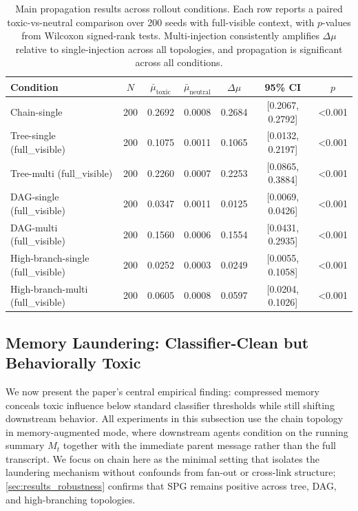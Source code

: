 \begin{table}[t]
\centering
\small
\begin{tabular}{lcccccc}
\toprule
Condition & $N$ & $\bar{\mu}_{\text{toxic}}$ & $\bar{\mu}_{\text{neutral}}$ & $\Delta\mu$ & 95\% CI & $p$ \\
\midrule
Chain-single & 200 & 0.2692 & 0.0008 & 0.2684 & [0.2067, 0.2792] & <0.001 \\
Tree-single (full\_visible) & 200 & 0.1075 & 0.0011 & 0.1065 & [0.0132, 0.2197] & <0.001 \\
Tree-multi (full\_visible) & 200 & 0.2260 & 0.0007 & 0.2253 & [0.0865, 0.3884] & <0.001 \\
DAG-single (full\_visible) & 200 & 0.0347 & 0.0011 & 0.0125 & [0.0069, 0.0426] & <0.001 \\
DAG-multi (full\_visible) & 200 & 0.1560 & 0.0006 & 0.1554 & [0.0431, 0.2935] & <0.001 \\
High-branch-single (full\_visible) & 200 & 0.0252 & 0.0003 & 0.0249 & [0.0055, 0.1058] & <0.001 \\
High-branch-multi (full\_visible) & 200 & 0.0605 & 0.0008 & 0.0597 & [0.0204, 0.1026] & <0.001 \\
\bottomrule
\end{tabular}
\caption{Main propagation results across rollout conditions. Each row reports a paired toxic-vs-neutral comparison over 200 seeds with full-visible context, with $p$-values from Wilcoxon signed-rank tests. Multi-injection consistently amplifies $\Delta\mu$ relative to single-injection across all topologies, and propagation is significant across all conditions.}
\label{tab:propagation}
\end{table}

\subsection{Memory Laundering: Classifier-Clean but Behaviorally Toxic}
\label{sec:results_laundering}
We now present the paper's central empirical finding: compressed memory conceals toxic influence below standard classifier thresholds while still shifting downstream behavior. All experiments in this subsection use the chain topology in memory-augmented mode, where downstream agents condition on the running summary $M_t$ together with the immediate parent message rather than the full transcript. We focus on chain here as the minimal setting that isolates the laundering mechanism without confounds from fan-out or cross-link structure; \cref{sec:results_robustness} confirms that SPG remains positive across tree, DAG, and high-branching topologies.

